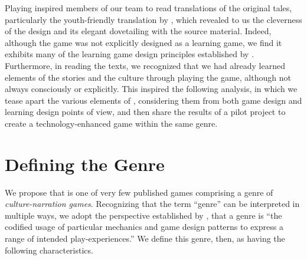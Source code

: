 \documentclass[a4paper]{article}
\begin{document}
Playing \totan{}  inspired members of our team to read translations
of the original tales,
particularly  the youth-friendly translation by \citep{Neil1994},
which revealed to us the cleverness of the design
and its elegant dovetailing with the source material.
Indeed, although the game was not explicitly designed as a learning game,
we find it exhibits many of the learning game design principles
established by \citet{Klopfer2009}.
Furthermore, in reading the texts, we recognized that we had already
learned elements of the stories and the culture through playing the game,
although not always consciously or explicitly.
This inspired the following analysis, in which we tease apart the
various elements of \totan{}, considering them from both game design
and learning design points of view, and then share the results of a pilot
project to create a technology-enhanced game within the same genre.

\section{Defining the Genre}

We propose that \totan{} is one of very few published games comprising a genre
of \textit{culture-narration games}. Recognizing that the term ``genre''
can be interpreted in multiple ways, we adopt the perspective established
by \citet{Arsenault2009},
that a genre is ``the codified usage of particular mechanics
and game design patterns to express a range of intended play-experiences.''
We define this genre, then, as having the following characteristics.
\end{document}
